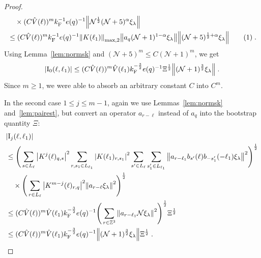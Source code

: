 \documentclass[12pt,a4paper]{article}
\numberwithin{equation}{section}
\newcommand{\cN}{\mathcal{N}}
\newcommand{\1}{\mathbb{I}}
\newcommand{\F}{\mathrm{F}}
\newcommand{\I}{\mathrm{I}}
\newcommand{\tagg}[1]{ \stepcounter{equation} \tag{\theequation}
\label{#1} } %
\newcommand{\Z}{\mathbb{Z}}
\newcommand{\NN}{\mathcal{N}}
\newcommand{\half}{\frac{1}{2}}
\theoremstyle{plain}
\theoremstyle{definition}
\theoremstyle{remark}
\theoremstyle{plain}
\theoremstyle{definition}
\theoremstyle{remark}
\begin{document}
\begin{proof}
\begin{align*}
	& \quad \times (C \hat{V}(\ell))^m k_{\F}^{-1} e(q)^{-1} \norm{ \NN^\half(\NN+5)^{\alpha}\xi_\lambda } \nonumber\\
	&\leq (C \hat{V}(\ell))^m k_{\F}^{-1} e(q)^{-1}  \norm{K(\ell_1)}_{\mathrm{max,2}} \norm{ a_{q}(\NN+1)^{1-\alpha}\xi_\lambda} \norm{ (\NN+5)^{\half+\alpha}\xi_\lambda } \tagg{eq:notimportant2} \;.
\end{align*}
Using Lemma~\ref{lem:normsk} and $ (\cN+5)^m \le C (\cN+1)^m $, we get
\begin{equation}
	 |\I_0(\ell, \ell_1)|
	 \leq (C \hat{V}(\ell))^m
	 	\hat{V}(\ell_1)
	 	k_{\F}^{-\frac{3}{2}} e(q)^{-1} \Xi^\half
	 	\norm { (\NN+1)^{\frac{3}{2}} \xi_\lambda } \;. \label{eq:estEQ1111} 
\end{equation}
Since $ m \ge 1 $, we were able to absorb an arbitrary constant $ C $ into $ C^m $.

In the second case $ 1 \le j \le m-1 $, again we use Lemmas~\ref{lem:normsk} and~\ref{lem:pairest}, but convert an operator $ a_{r-\ell} $ instead of $ a_q $ into the bootstrap quantity $ \Xi $:
\begin{align}
	&|\I_j(\ell, \ell_1)| \nonumber\\
	&\leq \Bigg( \sum_{s \in L_\ell} \abs{K^j(\ell)_{q,s}}^2
		\sum_{r, s_1 \in L_{\ell_1}} \abs{K(\ell_1)_{r,s_1}}^2
		\sum_{s' \in L_\ell} \sum_{s_1' \in L_{\ell_1}} \norm{a_{r-\ell_1} b_{s'}(\ell) b_{-s_1'}(-\ell_1) \xi_\lambda}^2 \Bigg)^\half \nonumber\\
	&\quad \times \Bigg( \sum_{r\in L_{\ell}} \abs{K^{m-j}(\ell)_{r,q}}^2 \norm{a_{r-\ell} \xi_\lambda }^2 \Bigg)^\half\nonumber\\
	&\leq (C \hat{V}(\ell))^m \hat{V}(\ell_1) k_{\F}^{-\frac 32} e(q)^{-1}
		\Bigg( \sum_{r \in \Z^3} \norm{a_{r-\ell_1} \cN \xi_\lambda}^2 \Bigg)^\half \Xi^\half \nonumber\\
	&\leq (C \hat{V}(\ell))^m
		\hat{V}(\ell_1)
		k_{\F}^{-\frac 32} e(q)^{-1}
		\norm{(\NN+1)^\frac{3}{2} \xi_\lambda} \Xi^\half \;. \label{eq:estEQ1112}
\end{align}


\end{proof}
\end{document}
